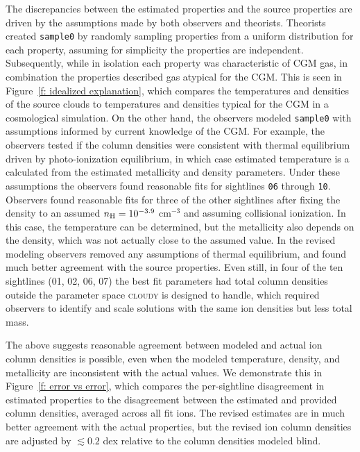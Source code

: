 \documentclass[fleqn,usenatbib]{mnras}
\begin{document}
The discrepancies between the estimated properties and the source properties are driven by the assumptions made by both observers and theorists.
Theorists created \texttt{sample0} by randomly sampling properties from a uniform distribution for each property, assuming for simplicity the properties are independent.
Subsequently, while in isolation each property was characteristic of CGM gas, in combination the properties described gas atypical for the CGM.
This is seen in Figure~\ref{f: idealized explanation}, which compares the temperatures and densities of the source clouds to temperatures and densities typical for the CGM in a cosmological simulation.
On the other hand, the observers modeled \texttt{sample0} with assumptions informed by current knowledge of the CGM.
For example, the observers tested if the column densities were consistent with thermal equilibrium driven by photo-ionization equilibrium, in which case estimated temperature is a calculated from the estimated metallicity and density parameters.
Under these assumptions the observers found reasonable fits for sightlines \texttt{06} through \texttt{10}.
Observers found reasonable fits for three of the other sightlines after fixing the density to an assumed $n_{\rm H} = 10^{-3.9}$ cm$^{-3}$ and assuming collisional ionization.
In this case, the temperature can be determined, but the metallicity also depends on the density,
which was not actually close to the assumed value.
In the revised modeling observers removed any assumptions of thermal equilibrium, and found much better agreement with the source properties.
Even still, in four of the ten sightlines (\textsc{01}, \textsc{02}, \textsc{06}, \textsc{07}) the best fit parameters had total  column densities outside the parameter space \textsc{cloudy} is designed to handle, which required observers to identify and scale solutions with the same ion densities but less total mass.

The above suggests reasonable agreement between modeled and actual ion column densities is possible, even when the modeled temperature, density, and metallicity are inconsistent with the actual values.
We demonstrate this in Figure~\ref{f: error vs error},
which compares the per-sightline disagreement in estimated properties to the disagreement between the estimated and provided column densities, averaged across all fit ions. 
The revised estimates are in much better agreement with the actual properties, but the revised ion column densities are adjusted by $\lesssim 0.2$ dex relative to the column densities modeled blind.
\end{document}
